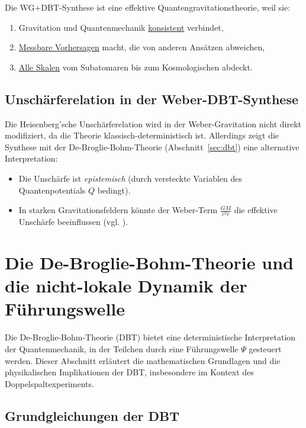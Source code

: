 \begin{tcolorbox}[
    width=\textwidth,
    colback=white,
    colframe=black,
    sharp corners,
    boxrule=0.5pt,
    left=3pt,right=3pt, %
    title=Kernaussage,
    fonttitle=\bfseries
]
Die WG+DBT-Synthese ist eine effektive Quantengravitationstheorie, weil sie:
\begin{enumerate}
    \item Gravitation und Quantenmechanik \underline{konsistent} verbindet,
    \item \underline{Messbare Vorhersagen} macht, die von anderen Ansätzen abweichen,
    \item \underline{Alle Skalen} vom Subatomaren bis zum Kosmologischen abdeckt.
\end{enumerate}
\end{tcolorbox}

\subsection{Unschärferelation in der Weber-DBT-Synthese}
Die Heisenberg’sche Unschärferelation wird in der Weber-Gravitation nicht direkt modifiziert, da die Theorie klassisch-deterministisch ist. Allerdings zeigt die Synthese mit der
De-Broglie-Bohm-Theorie (Abschnitt~\ref{sec:dbt}) eine alternative Interpretation:
\begin{itemize}
    \item Die Unschärfe ist \textit{epistemisch} (durch versteckte Variablen des Quantenpotentials $Q$ bedingt).
    \item In starken Gravitationsfeldern könnte der Weber-Term $\frac{GM}{c^2 r}$ die effektive Unschärfe beeinflussen (vgl. \cite{bohm1952}).
\end{itemize}

\section{Die De-Broglie-Bohm-Theorie und die nicht-lokale Dynamik der Führungswelle}

Die De-Broglie-Bohm-Theorie (DBT) bietet eine deterministische Interpretation der Quantenmechanik, in der Teilchen durch eine Führungswelle $\Psi$ gesteuert werden. Dieser Abschnitt erläutert die mathematischen Grundlagen und die physikalischen Implikationen der DBT, insbesondere im Kontext des Doppelspaltexperiments.

\subsection{Grundgleichungen der DBT}

